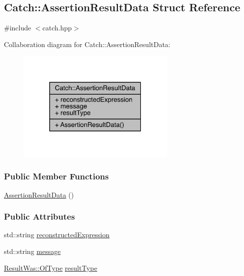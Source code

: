 \hypertarget{a00006}{}\subsection{Catch\+:\+:Assertion\+Result\+Data Struct Reference}
\label{a00006}


{\ttfamily \#include $<$catch.\+hpp$>$}



Collaboration diagram for Catch\+:\+:Assertion\+Result\+Data\+:\nopagebreak
\begin{figure}[H]
\begin{center}
\leavevmode
\includegraphics[width=219pt]{a00174}
\end{center}
\end{figure}
\subsubsection*{Public Member Functions}
\begin{DoxyCompactItemize}
\item 
\hyperlink{a00006_a37179edde9f853f22d4456677fd97701}{Assertion\+Result\+Data} ()
\end{DoxyCompactItemize}
\subsubsection*{Public Attributes}
\begin{DoxyCompactItemize}
\item 
std\+::string \hyperlink{a00006_a9e809d36fffbeb1c7d0cbe7382dd9595}{reconstructed\+Expression}
\item 
std\+::string \hyperlink{a00006_ac34215803c4c4a88f795879f61c1f7b4}{message}
\item 
\hyperlink{a00069_a624e1ee3661fcf6094ceef1f654601ef}{Result\+Was\+::\+Of\+Type} \hyperlink{a00006_a7ceab4a7ff722aec5587e3748caf66b7}{result\+Type}
\end{DoxyCompactItemize}


